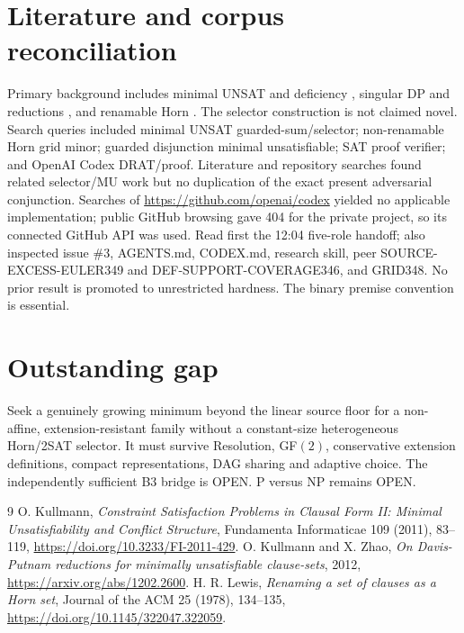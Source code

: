 \documentclass[11pt]{article}
\begin{document}
\section*{Literature and corpus reconciliation}
Primary background includes minimal UNSAT and deficiency \cite{Kullmann2011}, singular DP and reductions \cite{KullmannZhao2012}, and renamable Horn \cite{Lewis1978}. The selector construction is not claimed novel. Search queries included minimal UNSAT guarded-sum/selector; non-renamable Horn grid minor; guarded disjunction minimal unsatisfiable; SAT proof verifier; and OpenAI Codex DRAT/proof. Literature and repository searches found related selector/MU work but no duplication of the exact present adversarial conjunction. Searches of \url{https://github.com/openai/codex} yielded no applicable implementation; public GitHub browsing gave 404 for the private project, so its connected GitHub API was used. Read first the 12:04 five-role handoff; also inspected issue \#3, AGENTS.md, CODEX.md, research skill, peer SOURCE-EXCESS-EULER349 and DEF-SUPPORT-COVERAGE346, and GRID348. No prior result is promoted to unrestricted hardness. The binary premise convention is essential.

\section*{Outstanding gap}
Seek a genuinely growing minimum beyond the linear source floor for a non-affine, extension-resistant family without a constant-size heterogeneous Horn/2SAT selector. It must survive Resolution, GF$(2)$, conservative extension definitions, compact representations, DAG sharing and adaptive choice. The independently sufficient B3 bridge is OPEN. P versus NP remains OPEN.

\begin{thebibliography}{9}
 O. Kullmann, \emph{Constraint Satisfaction Problems in Clausal Form II: Minimal Unsatisfiability and Conflict Structure}, Fundamenta Informaticae 109 (2011), 83--119, \url{https://doi.org/10.3233/FI-2011-429}.
 O. Kullmann and X. Zhao, \emph{On Davis-Putnam reductions for minimally unsatisfiable clause-sets}, 2012, \url{https://arxiv.org/abs/1202.2600}.
 H. R. Lewis, \emph{Renaming a set of clauses as a Horn set}, Journal of the ACM 25 (1978), 134--135, \url{https://doi.org/10.1145/322047.322059}.
\end{thebibliography}
\end{document}
